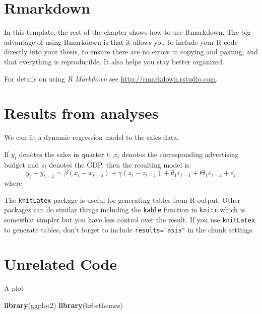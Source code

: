 \documentclass[oneside,12pt,a4paper,bibliography=totocnumbered,numbers=noenddot,table]{scrreprt} %
\newenvironment{Shaded}{\begin{snugshade}}{\end{snugshade}}
\newcommand{\KeywordTok}[1]{\textcolor[rgb]{0.13,0.29,0.53}{\textbf{{#1}}}}
\newcommand{\NormalTok}[1]{{#1}}
\begin{document}
\hypertarget{rmarkdown}{%
\section{Rmarkdown}\label{rmarkdown}}

In this template, the rest of the chapter shows how to use Rmarkdown. The big advantage of using Rmarkdown is that it allows you to include your R code directly into your thesis, to ensure there are no errors in copying and pasting, and that everything is reproducible. It also helps you stay better organized.

For details on using \emph{R Markdown} see \url{http://rmarkdown.rstudio.com}.

\hypertarget{results-from-analyses}{%
\section{Results from analyses}\label{results-from-analyses}}

We can fit a dynamic regression model to the sales data.

If \(y_t\) denotes the sales in quarter \(t\), \(x_t\) denotes the corresponding advertising budget and \(z_t\) denotes the GDP, then the resulting model is:
\begin{equation}
  y_t - y_{t-4} = \beta (x_t-x_{t-4}) + \gamma (z_t-z_{t-4}) + \theta_1 \varepsilon_{t-1} + \Theta_1 \varepsilon_{t-4} + \varepsilon_t
\end{equation}
where

The \texttt{knitLatex} package is useful for generating tables from R output. Other packages can do similar things including the \texttt{kable} function in \texttt{knitr} which is somewhat simpler but you have less control over the result. If you use \texttt{knitLatex} to generate tables, don't forget to include \texttt{results="asis"} in the chunk settings.

\hypertarget{unrelated-code}{%
\section{Unrelated Code}\label{unrelated-code}}

A plot

\begin{Shaded}
\begin{Highlighting}[]
\KeywordTok{library}\NormalTok{(ggplot2)}
\KeywordTok{library}\NormalTok{(hrbrthemes)}
\end{Highlighting}
\end{Shaded}
\end{document}

